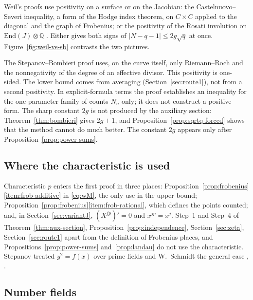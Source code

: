 \documentclass[11pt]{amsbook}
\theoremstyle{plain}
\theoremstyle{definition}
\theoremstyle{remark}
\numberwithin{equation}{section}
\numberwithin{figure}{chapter}
\numberwithin{table}{chapter}
\newcommand{\Q}{\mathbb{Q}}
\begin{document}
Weil's proofs use positivity on a surface or on the Jacobian: the
Castelnuovo--Severi inequality, a form of the Hodge index theorem,
on $C\times C$ applied to the diagonal and the graph of Frobenius;
or the positivity of the Rosati involution on
$\mathrm{End}(J)\otimes\Q$ \cite{Weil1948}. Either gives both signs
of $\lvert N-q-1\rvert\le2g\sqrt q$ at once.
Figure~\ref{fig:weil-vs-sb} contrasts the two pictures.

The Stepanov--Bombieri proof uses, on the curve itself, only
Riemann--Roch and the nonnegativity of the degree of an effective
divisor. This positivity is one-sided. The lower bound comes from
averaging (Section~\ref{sec:route1}), not from a second positivity.
In explicit-formula terms the proof establishes an inequality for
the one-parameter family of counts $N_n$ only; it does not
construct a positive form. The sharp constant $2g$ is not produced
by the auxiliary section: Theorem~\ref{thm:bombieri} gives $2g+1$,
and Proposition~\ref{prop:sqrtq-forced} shows that the method
cannot do much better. The constant $2g$ appears only after
Proposition~\ref{prop:power-sums}.

\subsection{Where the characteristic is used}

Characteristic $p$ enters the first proof in three places:
Proposition~\ref{prop:frobenius}\eqref{item:frob-additive} in
\eqref{eq:wM}, the only use in the upper bound;
Proposition~\ref{prop:frobenius}\eqref{item:frob-rational}, which
defines the points counted; and, in Section~\ref{sec:variantJ},
$(X^{jp})'=0$ and $x^{jp}=x^j$. Step~1 and Step~4 of
Theorem~\ref{thm:aux-section},
Proposition~\ref{prop:independence}, Section~\ref{sec:zeta},
Section~\ref{sec:route1} apart from the definition of Frobenius
places, and Propositions~\ref{prop:power-sums}
and~\ref{prop:landau} do not use the characteristic. Stepanov
treated $y^2=f(x)$ over prime fields and W.~Schmidt the general
case \cite[p.~234]{Bombieri1974}, \cite{Schmidt1973}.

\subsection{Number fields}
\end{document}
